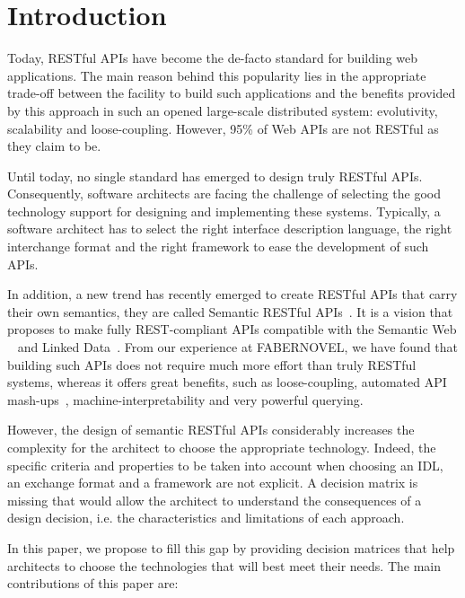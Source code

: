 \section{Introduction}

Today, RESTful APIs \cite{FieldingThesis} have become the de-facto standard for building web applications. The main reason behind this popularity lies in the appropriate trade-off between the facility to build such applications and the benefits provided by this approach in such an opened large-scale distributed system: evolutivity, scalability and loose-coupling. However, 95\% of Web APIs are not RESTful \cite{10.1007/978-3-319-38791-8_2} as they claim to be.

Until today, no single standard has emerged to design truly RESTful APIs. Consequently, software architects are facing the challenge of selecting the good technology support for designing and implementing these systems. Typically, a software architect has to select the right interface description language, the right  interchange format and the right framework to ease the development of such APIs.

In addition, a new trend has recently emerged to create RESTful APIs that carry their own semantics, they are called Semantic RESTful APIs~\cite{7195633}. It is a vision that proposes to make fully REST-compliant APIs compatible with the Semantic Web ~\cite{TheSemanticWeb} and Linked Data~\cite{LinkedDataPrinciples}. From our experience at FABERNOVEL, we have found that building such APIs does not require much more effort than truly RESTful systems, whereas it offers great benefits, such as loose-coupling, automated API mash-ups~\cite{benslimane2008services}, machine-interpretability and very powerful querying. 

However, the design of semantic RESTful APIs considerably increases the complexity for the architect to choose the appropriate technology. Indeed, the specific criteria and properties to be taken into account when choosing an IDL, an exchange format and a framework are not explicit. A decision matrix is missing that would allow the architect to understand the consequences of a design decision, i.e. the characteristics and limitations of each approach.
 
In this paper, we propose to fill this gap by providing decision matrices that help architects to choose the technologies that will best meet their needs. The main contributions of this paper are:

